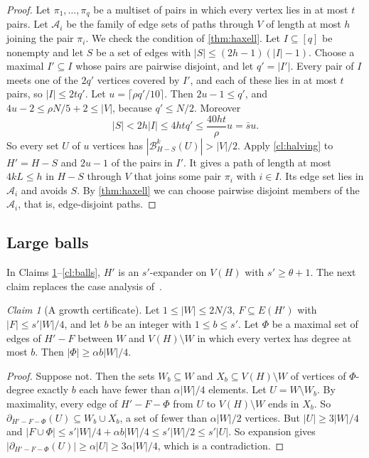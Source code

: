 \documentclass[11pt]{article}
\theoremstyle{definition}
\theoremstyle{remark}
\newtheorem{aclaim}[theorem]{Claim}
\numberwithin{equation}{section}
\numberwithin{figure}{section}
\numberwithin{table}{section}
\newcommand{\NN}{\partial}
\newcommand{\cA}{\mathcal{A}}
\newcommand{\cB}{\mathcal{B}}
\begin{document}
\begin{proof}
Let $\pi_1,\dots,\pi_q$ be a multiset of pairs in which every vertex lies in at
most $t$ pairs. Let $\cA_i$ be the family of edge sets of paths through $V$ of
length at most $h$ joining the pair $\pi_i$. We check the condition of
\cref{thm:haxell}. Let $I\subseteq[q]$ be nonempty and let $S$ be a set of edges
with $|S|\le(2h-1)(|I|-1)$. Choose a maximal $I'\subseteq I$ whose pairs are
pairwise disjoint, and let $q'=|I'|$. Every pair of $I$ meets one of the $2q'$
vertices covered by $I'$, and each of these lies in at most $t$ pairs, so
$|I|\le2tq'$. Let $u=\lceil\rho q'/10\rceil$. Then $2u-1\le q'$, and
$4u-2\le\rho N/5+2\le|V|$, because $q'\le N/2$. Moreover
\[
|S|<2h|I|\le4htq'\le\frac{40ht}{\rho}u=\bar su.
\]
So every set $U$ of $u$ vertices has $|\cB^k_{H-S}(U)|>|V|/2$. Apply
\cref{cl:halving} to $H'=H-S$ and $2u-1$ of the pairs in $I'$. It gives a path
of length at most $4kL\le h$ in $H-S$ through $V$ that joins some pair $\pi_i$
with $i\in I$. Its edge set lies in $\cA_i$ and avoids $S$. By
\cref{thm:haxell} we can choose pairwise disjoint members of the $\cA_i$, that
is, edge-disjoint paths.
\end{proof}

\subsection*{Large balls}

In Claims \ref{cl:certificate}--\ref{cl:balls}, $H'$ is an $s'$-expander on
$V(H)$ with $s'\ge\theta+1$. The next claim replaces the case analysis
of~\cite[Proposition~13]{BM}.

\begin{aclaim}[A growth certificate]\label{cl:certificate}
Let $1\le|W|\le2N/3$, $F\subseteq E(H')$ with $|F|\le s'|W|/4$, and let $b$ be
an integer with $1\le b\le s'$. Let $\Phi$ be a maximal set of edges of
$H'-F$ between $W$ and $V(H)\setminus W$ in which every vertex has degree at
most $b$. Then $|\Phi|\ge\alpha b|W|/4$.
\end{aclaim}

\begin{proof}
Suppose not. Then the sets $W_b\subseteq W$ and $X_b\subseteq V(H)\setminus W$ of
vertices of $\Phi$-degree exactly $b$ each have fewer than $\alpha|W|/4$
elements. Let $U=W\setminus W_b$. By maximality, every edge of $H'-F-\Phi$ from
$U$ to $V(H)\setminus W$ ends in $X_b$. So $\NN_{H'-F-\Phi}(U)\subseteq W_b\cup X_b$,
a set of fewer than $\alpha|W|/2$ vertices. But $|U|\ge3|W|/4$ and
$|F\cup\Phi|\le s'|W|/4+\alpha b|W|/4\le s'|W|/2\le s'|U|$. So expansion
gives $|\NN_{H'-F-\Phi}(U)|\ge\alpha|U|\ge3\alpha|W|/4$, which is a
contradiction.
\end{proof}
\end{document}
